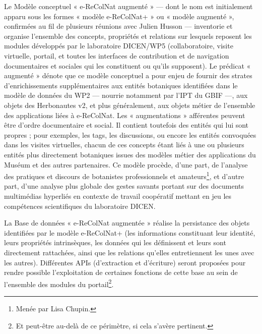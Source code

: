 \startchapter[title={Terminologie}]

\startsection[title={Le modèle « e-RecolNat+ »}]

Le Modèle conceptuel « e-ReColNat augmenté » --- dont le nom est initialement apparu sous les formes « modèle e-ReColNat+ » ou « modèle augmenté », confirmées au fil de plusieurs réunions avec Julien Husson --- inventorie et organise l'ensemble des concepts, propriétés et relations sur lesquels reposent les modules développés par le laboratoire DICEN/WP5 (collaboratoire, visite virtuelle, portail, et toutes les interfaces de contribution et de navigation documentaires et sociales qui les constituent ou qu'ils supposent).
Le prédicat « augmenté » dénote que ce modèle conceptuel a pour enjeu de fournir des strates d'enrichissements supplémentaires aux entités botaniques identifiées dans le modèle de données du WP2 --- nourrie notamment par l'IPT du GBIF ---, aux objets des Herbonautes v2, et plus généralement, aux objets métier de l'ensemble des applications liées à e-ReColNat.
Les « augmentations » afférentes peuvent être d'ordre documentaire et social.
Il contient toutefois des entités qui lui sont propres ; pour exemples, les tags, les discussions, ou encore les entités convoquées dans les visites virtuelles, chacun de ces concepts étant liés à une ou plusieurs entités plus directement botaniques issues des modèles métier des applications du Muséum et des autres partenaires.
Ce modèle procède, d'une part, de l'analyse des pratiques et discours de botanistes professionnels et amateurs\footnote{Menée par Lisa Chupin.}, et d'autre part, d'une analyse plus globale des gestes savants portant sur des documents multimédias hyperliés en contexte de travail coopératif mettant en jeu les compétences scientifiques du laboratoire DICEN.

\stopsection
\startsection[title={La base « e-ReColNat+ »},reference=terme:base]

La Base de données « e-ReColNat augmentée » réalise la persistance des objets identifiées par le modèle e-ReColNat+ (les informations constituant leur identité, leurs propriétés intrinsèques, les données qui les définissent et leurs sont directement rattachées, ainsi que les relations qu'elles entretiennent les unes avec les autres).
Différentes APIs (d'extraction et d'écriture) seront proposées pour rendre possible l'exploitation de certaines fonctions de cette base au sein de l'ensemble des modules du portail\footnote{Et peut-être au-delà de ce périmètre, si cela s'avère pertinent.}.

\stopsection
\stopchapter